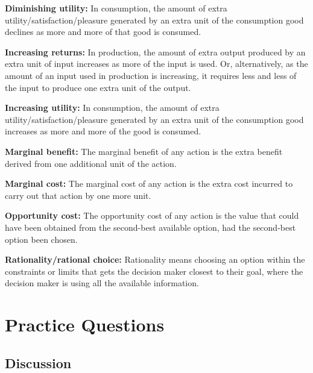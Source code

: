 \documentclass[
]{book}
\begin{document}
\textbf{Diminishing utility:} In consumption, the amount of extra utility/satisfaction/pleasure generated by an extra unit of the consumption good declines as more and more of that good is consumed.

\textbf{Increasing returns:} In production, the amount of extra output produced by an extra unit of input increases as more of the input is used. Or, alternatively, as the amount of an input used in production is increasing, it requires less and less of the input to produce one extra unit of the output.

\textbf{Increasing utility:} In consumption, the amount of extra utility/satisfaction/pleasure generated by an extra unit of the consumption good increases as more and more of the good is consumed.

\textbf{Marginal benefit:} The marginal benefit of any action is the extra benefit derived from one additional unit of the action.

\textbf{Marginal cost:} The marginal cost of any action is the extra cost incurred to carry out that action by one more unit.

\textbf{Opportunity cost:} The opportunity cost of any action is the value that could have been obtained from the second-best available option, had the second-best option been chosen.

\textbf{Rationality/rational choice:} Rationality means choosing an option within the constraints or limits that gets the decision maker closest to their goal, where the decision maker is using all the available information.

\hypertarget{practice-questions-2}{%
\section{Practice Questions}\label{practice-questions-2}}

\hypertarget{discussion-2}{%
\subsection{Discussion}\label{discussion-2}}
\end{document}
